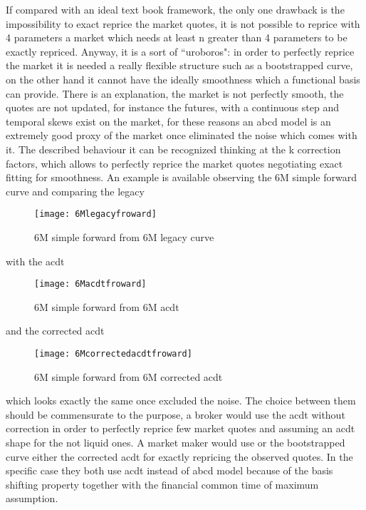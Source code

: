 If compared with an ideal text book framework, the only one drawback is the impossibility to exact reprice the market quotes, it is not possible to reprice with 4 parameters a market which needs at least n greater than 4 parameters to be exactly repriced. Anyway, it is a sort of ``uroboros": in order to perfectly reprice the market it is needed a really flexible structure such as a bootstrapped curve, on the other hand it cannot have the ideally smoothness which a functional basis can provide. There is an explanation, the market is not perfectly smooth, the quotes are not updated, for instance the futures, with a continuous step and temporal skews exist on the market, for these reasons an abcd model is an extremely good proxy of the market once eliminated the noise which comes with it. The described behaviour it can be recognized thinking at the k correction factors, which allows to perfectly reprice the market quotes negotiating exact fitting for smoothness.
An example is available observing the 6M simple forward curve and comparing the legacy

\begin{figure}[H]
\centering
\texttt{[image: 6Mlegacyfroward]}
\caption{6M simple forward from 6M legacy curve}
\label{fig:6Mlegacyfroward}
\end{figure}

with the acdt

\begin{figure}[H]
\centering
\texttt{[image: 6Macdtfroward]}
\caption{6M simple forward from 6M acdt}
\label{fig:6Macdtfroward}
\end{figure}

and the corrected acdt

\begin{figure}[H]
\centering
\texttt{[image: 6Mcorrectedacdtfroward]}
\caption{6M simple forward from 6M corrected acdt}
\label{fig:6Mcorrectedacdtfroward}
\end{figure}

which looks exactly the same once excluded the noise.
The choice between them should be commensurate to the purpose, a broker would use the acdt without correction in order to perfectly reprice few market quotes and assuming an acdt shape for the not liquid ones. A market maker would use or the bootstrapped curve either the corrected acdt for exactly repricing the observed quotes.
In the specific case they both use acdt instead of abcd model because of the basis shifting property together with the financial common time of maximum assumption.

